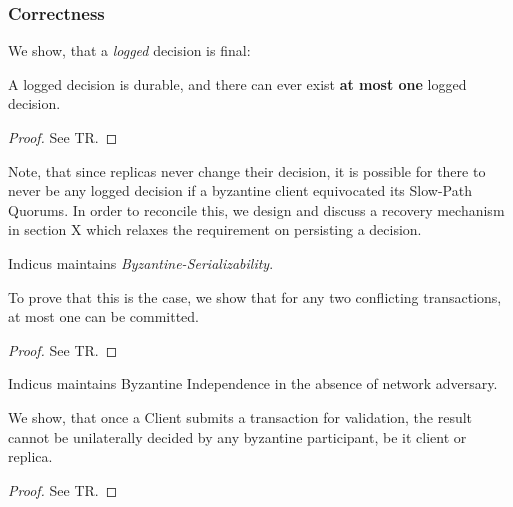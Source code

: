 \subsubsection{Correctness}
We show, that a \textit{logged} decision is final:
\begin{theorem}[Saf]
A logged decision is durable, and there can ever exist \textbf{at most one} logged decision.
\end{theorem}
\begin{proof}
See TR.
\end{proof} 

Note, that since replicas never change their decision, it is possible for there to never be any logged decision if a byzantine client equivocated its Slow-Path Quorums. In order to reconcile this, we design and discuss a recovery mechanism in section X which relaxes the requirement on persisting a decision.  


\begin{theorem} 
Indicus maintains \textit{Byzantine-Serializability}.
\end{theorem}
To prove that this is the case, we show that for any two conflicting transactions, at most one can be committed.
\begin{proof}
See TR.
\end{proof}

\begin{theorem} 
Indicus maintains Byzantine Independence in the absence of network adversary.
\end{theorem}

We show, that once a Client submits a transaction for validation, the result cannot be unilaterally decided by any byzantine participant, be it client or replica.
\begin{proof}
See TR.
\end{proof}